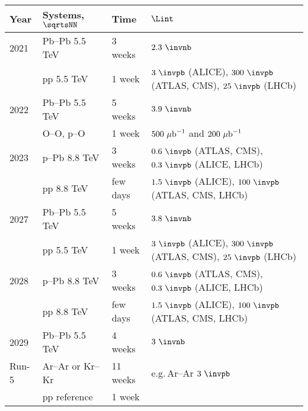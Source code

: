 \documentclass[../report.tex]{subfiles}
\begin{document}
\begin{center}
\begin{tabular}{llll}
Year & Systems, $\sqrtsNN$ & Time & $\Lint$ \\
\hline
2021 &  Pb--Pb 5.5 TeV & 3 weeks & $2.3~\invnb$ \\
     &  pp 5.5 TeV & 1 week & $3~\invpb$ (ALICE), $300~\invpb$ (ATLAS, CMS), $25~\invpb$ (LHCb)  \\
\hline
2022 &  Pb--Pb 5.5 TeV & 5 weeks & $3.9~\invnb$ \\
     &  O--O, p--O & 1 week & $500~{\rm \mu b}^{-1}$ and $200~{\rm \mu b}^{-1}$ \\
\hline
2023 &  p--Pb 8.8 TeV & 3 weeks & $0.6~\invpb$ (ATLAS, CMS), $0.3~\invpb$ (ALICE, LHCb) \\
     &  pp 8.8 TeV & few days & $1.5~\invpb$ (ALICE), $100~\invpb$ (ATLAS, CMS, LHCb)  \\
\hline
2027 &  Pb--Pb 5.5 TeV & 5 weeks & $3.8~\invnb$ \\
     &  pp 5.5 TeV & 1 week & $3~\invpb$ (ALICE), $300~\invpb$ (ATLAS, CMS), $25~\invpb$ (LHCb)  \\
\hline
2028 &  p--Pb 8.8 TeV & 3 weeks & $0.6~\invpb$ (ATLAS, CMS), $0.3~\invpb$ (ALICE, LHCb) \\
     &  pp 8.8 TeV & few days & $1.5~\invpb$ (ALICE), $100~\invpb$ (ATLAS, CMS, LHCb)  \\
\hline
2029 &  Pb--Pb 5.5 TeV & 4 weeks & $3~\invnb$ \\
\hline
Run-5 &  Ar--Ar or Kr--Kr & 11 weeks & e.g.\,Ar--Ar $3~\invpb$ \\
     &  pp reference & 1 week & \\
\hline
\end{tabular}
\end{center}
\end{document}

